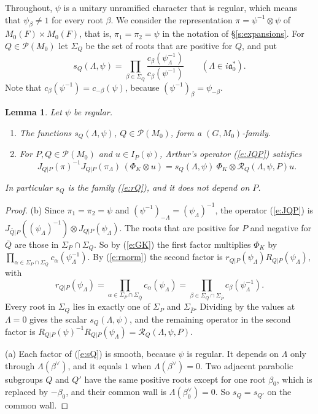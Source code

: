 \documentclass[12pt,letterpaper]{article}
\numberwithin{equation}{section}
\theoremstyle{plain}
\newtheorem{lemma}[theorem]{Lemma}
\theoremstyle{definition}
\theoremstyle{remark}
\newcommand{\cP}{\mathcal{P}}
\newcommand{\fa}{\mathfrak{a}}
\begin{document}
Throughout, $\psi$ is a unitary unramified character that is regular, which means that $\psi_\beta\ne1$ for every root $\beta$. We consider the representation $\pi=\psi^{-1}\otimes\psi$ of $M_0(F)\times M_0(F)$, that is, $\pi_1=\pi_2=\psi$ in the notation of \S\ref{s:expansions}. For $Q\in\cP(M_0)$ let $\Sigma_Q$ be the set of roots that are positive for $Q$, and put
\begin{equation}\label{e:sQ}
s_Q(\Lambda,\psi)=\prod_{\beta\in\Sigma_Q}\frac{c_\beta(\psi_\Lambda^{-1})}{c_\beta(\psi^{-1})}\qquad(\Lambda\in i\fa_0^*).
\end{equation}
Note that $c_\beta(\psi^{-1})=c_{-\beta}(\psi)$, because $(\psi^{-1})_\beta=\psi_{-\beta}$.

\begin{lemma}\label{l:sfam}
Let $\psi$ be regular.
\begin{enumerate}[label=(\alph*)]
\item The functions $s_Q(\Lambda,\psi)$, $Q\in\cP(M_0)$, form a $(G,M_0)$-family.
\item For $P,Q\in\cP(M_0)$ and $u\in I_P(\psi)$, Arthur's operator (\ref{e:JQP}) satisfies
\[
J_{Q|P}(\pi)^{-1}J_{Q|P}(\pi_\Lambda)\,(\Phi_K\otimes u)=s_Q(\Lambda,\psi)\ \Phi_K\otimes\mathcal R_Q(\Lambda,\psi,P)u .
\]
\end{enumerate}
In particular $s_Q$ is the family (\ref{e:rQ}), and it does not depend on $P$.
\end{lemma}

\begin{proof}
(b) Since $\pi_1=\pi_2=\psi$ and $(\psi^{-1})_{-\Lambda}=(\psi_\Lambda)^{-1}$, the operator (\ref{e:JQP}) is $J_{\bar Q|P}((\psi_\Lambda)^{-1})\otimes J_{Q|P}(\psi_\Lambda)$. The roots that are positive for $P$ and negative for $\bar Q$ are those in $\Sigma_P\cap\Sigma_Q$. So by (\ref{e:GK}) the first factor multiplies $\Phi_K$ by $\prod_{\alpha\in\Sigma_P\cap\Sigma_Q}c_\alpha(\psi_\Lambda^{-1})$. By (\ref{e:rnorm}) the second factor is $r_{Q|P}(\psi_\Lambda)R_{Q|P}(\psi_\Lambda)$, with
\[
r_{Q|P}(\psi_\Lambda)=\prod_{\alpha\in\Sigma_P\cap\Sigma_{\bar Q}}c_\alpha(\psi_\Lambda)=\prod_{\beta\in\Sigma_Q\cap\Sigma_{\bar P}}c_\beta(\psi_\Lambda^{-1}).
\]
Every root in $\Sigma_Q$ lies in exactly one of $\Sigma_P$ and $\Sigma_{\bar P}$. Dividing by the values at $\Lambda=0$ gives the scalar $s_Q(\Lambda,\psi)$, and the remaining operator in the second factor is $R_{Q|P}(\psi)^{-1}R_{Q|P}(\psi_\Lambda)=\mathcal R_Q(\Lambda,\psi,P)$.

(a) Each factor of (\ref{e:sQ}) is smooth, because $\psi$ is regular. It depends on $\Lambda$ only through $\Lambda(\beta^\vee)$, and it equals $1$ when $\Lambda(\beta^\vee)=0$. Two adjacent parabolic subgroups $Q$ and $Q'$ have the same positive roots except for one root $\beta_0$, which is replaced by $-\beta_0$, and their common wall is $\Lambda(\beta_0^\vee)=0$. So $s_Q=s_{Q'}$ on the common wall.
\end{proof}
\end{document}
